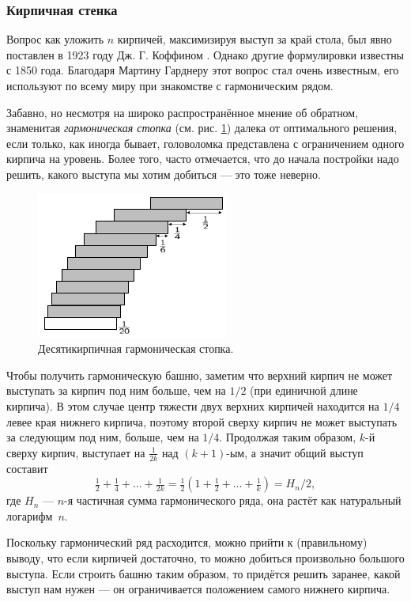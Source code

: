 \subsubsection*{Кирпичная стенка}

Вопрос как уложить $n$ кирпичей, максимизируя выступ за край стола, был явно поставлен в 1923 году Дж. Г. Коффином \cite{12}.
Однако другие формулировки известны с 1850 года.
Благодаря Мартину Гарднеру этот вопрос стал очень известным, его используют по всему миру при знакомстве с гармоническим рядом.

Забавно, но несмотря на широко распространённое мнение об обратном, знаменитая \emph{гармоническая стопка} (см. рис. \ref{pic:kirpich1}) далека от оптимального решения, если только, как иногда бывает, головоломка представлена с ограничением одного кирпича на уровень.
Более того, часто отмечается, что до начала постройки надо решить, 
какого выступа мы хотим добиться --- это тоже неверно.

\begin{figure}[ht!]
\centering
\includegraphics[scale=1]{pics/kirpich1}
\caption{Десятикирпичная гармоническая стопка.}
\label{pic:kirpich1}
\end{figure}

Чтобы получить гармоническую башню, заметим что верхний кирпич не может выступать за  кирпич под ним больше, чем на $1/2$ (при единичной длине кирпича).
В этом случае центр тяжести двух верхних кирпичей находится на $1/4$ левее края нижнего кирпича, поэтому второй сверху кирпич не может выступать за следующим под ним, больше, чем на $1/4$.
Продолжая таким образом, $k$-й сверху кирпич, выступает на $\tfrac1{2k}$ над $(k + 1)$-ым, а значит общий выступ составит 
\[\tfrac12+\tfrac14+\dots+\tfrac1{2k}=\tfrac12(1+\tfrac12+\dots+\tfrac1k)=H_n/2,\]
где $H_n$ --- $n$-я частичная сумма гармонического ряда, она растёт как натуральный логарифм~$n$.

Поскольку гармонический ряд расходится, можно прийти к (правильному) выводу, что если кирпичей достаточно, то можно добиться произвольно большого выступа.
Если строить башню таким образом, то придётся решить заранее, какой выступ нам нужен --- он ограничивается положением самого нижнего кирпича.


